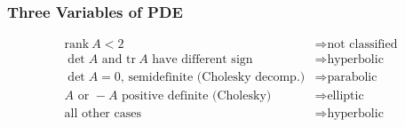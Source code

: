 \subsubsection{Three Variables of PDE}

\begin{align*}
    \mathrm{rank}\ A < 2 & \Rightarrow \text{not classified} \\
    \det A\text{ and }\mathrm{tr}\ A\text{ have different sign} & \Rightarrow\text{hyperbolic} \\
    \det A=0\text{, semidefinite (Cholesky decomp.)} & \Rightarrow\text{parabolic} \\
    A\text{ or }-A\text{ positive definite (Cholesky)} & \Rightarrow\text{elliptic} \\
    \text{all other cases} & \Rightarrow\text{hyperbolic}
\end{align*}
